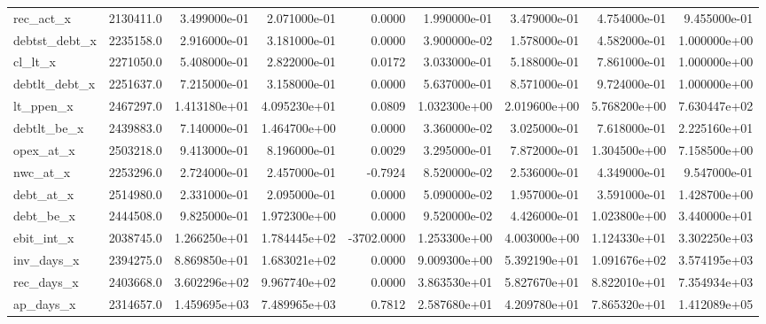 \documentclass[10pt]{article}
\begin{document}
\begin{landscape}
\begin{longtable}{|l|r|r|r|r|r|r|r|r|}
rec\_act\_x               &  2130411.0 &  3.499000e-01 &  2.071000e-01 &      0.0000 &  1.990000e-01 &  3.479000e-01 &  4.754000e-01 &  9.455000e-01 \\
debtst\_debt\_x           &  2235158.0 &  2.916000e-01 &  3.181000e-01 &      0.0000 &  3.900000e-02 &  1.578000e-01 &  4.582000e-01 &  1.000000e+00 \\
cl\_lt\_x                 &  2271050.0 &  5.408000e-01 &  2.822000e-01 &      0.0172 &  3.033000e-01 &  5.188000e-01 &  7.861000e-01 &  1.000000e+00 \\
debtlt\_debt\_x           &  2251637.0 &  7.215000e-01 &  3.158000e-01 &      0.0000 &  5.637000e-01 &  8.571000e-01 &  9.724000e-01 &  1.000000e+00 \\
lt\_ppen\_x               &  2467297.0 &  1.413180e+01 &  4.095230e+01 &      0.0809 &  1.032300e+00 &  2.019600e+00 &  5.768200e+00 &  7.630447e+02 \\
debtlt\_be\_x             &  2439883.0 &  7.140000e-01 &  1.464700e+00 &      0.0000 &  3.360000e-02 &  3.025000e-01 &  7.618000e-01 &  2.225160e+01 \\
opex\_at\_x               &  2503218.0 &  9.413000e-01 &  8.196000e-01 &      0.0029 &  3.295000e-01 &  7.872000e-01 &  1.304500e+00 &  7.158500e+00 \\
nwc\_at\_x                &  2253296.0 &  2.724000e-01 &  2.457000e-01 &     -0.7924 &  8.520000e-02 &  2.536000e-01 &  4.349000e-01 &  9.547000e-01 \\
debt\_at\_x               &  2514980.0 &  2.331000e-01 &  2.095000e-01 &      0.0000 &  5.090000e-02 &  1.957000e-01 &  3.591000e-01 &  1.428700e+00 \\
debt\_be\_x               &  2444508.0 &  9.825000e-01 &  1.972300e+00 &      0.0000 &  9.520000e-02 &  4.426000e-01 &  1.023800e+00 &  3.440000e+01 \\
ebit\_int\_x              &  2038745.0 &  1.266250e+01 &  1.784445e+02 &  -3702.0000 &  1.253300e+00 &  4.003000e+00 &  1.124330e+01 &  3.302250e+03 \\
inv\_days\_x              &  2394275.0 &  8.869850e+01 &  1.683021e+02 &      0.0000 &  9.009300e+00 &  5.392190e+01 &  1.091676e+02 &  3.574195e+03 \\
rec\_days\_x              &  2403668.0 &  3.602296e+02 &  9.967740e+02 &      0.0000 &  3.863530e+01 &  5.827670e+01 &  8.822010e+01 &  7.354934e+03 \\
ap\_days\_x               &  2314657.0 &  1.459695e+03 &  7.489965e+03 &      0.7812 &  2.587680e+01 &  4.209780e+01 &  7.865320e+01 &  1.412089e+05 \\

\end{longtable}
\end{landscape}
\end{document}
